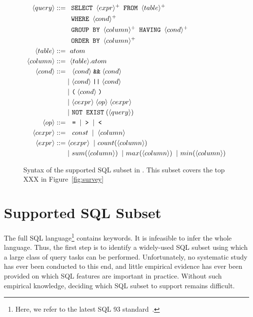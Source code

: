 \begin{figure}[t]
\footnotesize%
\begin{align*}
\langle query\rangle ::= {} 
	& \texttt{ SELECT } \langle expr\rangle^+ \texttt{ FROM } \langle table\rangle^+ \\
        & \texttt{ WHERE } \langle cond\rangle^+ \\ 
	&  \texttt{ GROUP BY } \langle column\rangle^+ \texttt{ HAVING } \langle cond\rangle^+\\
	&  \texttt{ ORDER BY } \langle column\rangle^+ \\
\langle table\rangle::= {} &\ atom \\
\langle column\rangle ::= {} &\ \langle table\rangle.atom\\
\langle cond\rangle ::= {} &\ \ \langle cond\rangle \;\texttt{\&\&}\; \langle cond\rangle \\ 
    & |\ \langle cond\rangle \;\texttt{||}\; \langle cond\rangle \\
    & |\ \texttt{(}\;\langle cond\rangle\;\texttt{)} \\
    & |\ \langle cexpr\rangle \;\langle op\rangle\; \langle cexpr\rangle \\
    & |\ \texttt{NOT EXIST} \;(\langle query\rangle) \\
\langle op\rangle ::= {} &\ \ \texttt{=} \;\;|\;\; \texttt{>}  \;\;|\;\; \texttt{<}\\
\langle cexpr\rangle ::= {} &\ \ const \;\;|\;\; \langle column\rangle  \;\; \\
\langle expr\rangle ::= {} & \langle cexpr\rangle \;\;|\ count(\langle column\rangle) \\
    & |\ sum(\langle column\rangle) \;\;|\ max(\langle column\rangle) \;\;|\ min(\langle column\rangle) 
\end{align*}
\normalsize%
\caption{Syntax of the supported SQL subset in \ourtool.
This subset covers the top XXX 
in Figure~\ref{fig:survey}}
\label{fig:syntax}
\end{figure}


\section{Supported SQL Subset}
\label{sec:langsubset}


The full SQL language\footnote{Here, we refer to
the latest SQL 93 standard~\cite{}.} contains
 keywords. It is infeasible to infer
the whole language.  Thus, the
first step is to identify a widely-used SQL
subset using which a large class of query tasks
can be performed. Unfortunately, no systematic
study has ever been conducted to this end,
and little empirical evidence has ever been provided
on which SQL features are important in practice.
Without such empirical knowledge, deciding which
SQL subset to support remains difficult.

